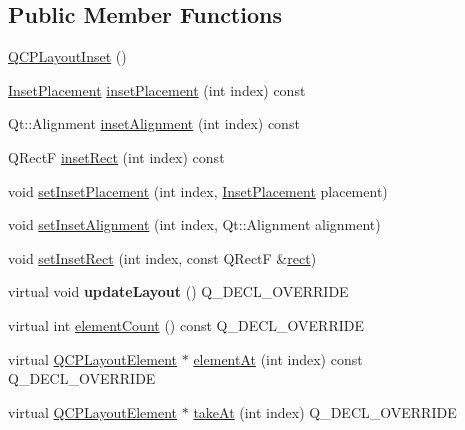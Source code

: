 \subsection*{Public Member Functions}
\begin{DoxyCompactItemize}
\item 
\hyperlink{class_q_c_p_layout_inset_a3ad984f3221735374cc5dee14356a7dd}{Q\+C\+P\+Layout\+Inset} ()
\item 
\hyperlink{class_q_c_p_layout_inset_a8b9e17d9a2768293d2a7d72f5e298192}{Inset\+Placement} \hyperlink{class_q_c_p_layout_inset_a6fcbd74ebbc45bfe64c604b2791aa57f}{inset\+Placement} (int index) const
\item 
Qt\+::\+Alignment \hyperlink{class_q_c_p_layout_inset_a5b33b66f0abbb4a7cc2f8aa6c94cf7f8}{inset\+Alignment} (int index) const
\item 
Q\+RectF \hyperlink{class_q_c_p_layout_inset_ab23099a46af17c31f4c40668f13c9de1}{inset\+Rect} (int index) const
\item 
void \hyperlink{class_q_c_p_layout_inset_a63298830744d5d8c5345511c00fd2144}{set\+Inset\+Placement} (int index, \hyperlink{class_q_c_p_layout_inset_a8b9e17d9a2768293d2a7d72f5e298192}{Inset\+Placement} placement)
\item 
void \hyperlink{class_q_c_p_layout_inset_a62882a4f9ad58bb0f53da12fde022abe}{set\+Inset\+Alignment} (int index, Qt\+::\+Alignment alignment)
\item 
void \hyperlink{class_q_c_p_layout_inset_aa487c8378a6f9533567a2e6430099dc3}{set\+Inset\+Rect} (int index, const Q\+RectF \&\hyperlink{class_q_c_p_layout_element_a208effccfe2cca4a0eaf9393e60f2dd4}{rect})
\item 
\mbox{\label{class_q_c_p_layout_inset_a493526b922ea66a75c45ef1842446988}} 
virtual void {\bfseries update\+Layout} () Q\+\_\+\+D\+E\+C\+L\+\_\+\+O\+V\+E\+R\+R\+I\+DE
\item 
virtual int \hyperlink{class_q_c_p_layout_inset_a7f5aa4d48a2e844cfe6dd7ed8f0861df}{element\+Count} () const Q\+\_\+\+D\+E\+C\+L\+\_\+\+O\+V\+E\+R\+R\+I\+DE
\item 
virtual \hyperlink{class_q_c_p_layout_element}{Q\+C\+P\+Layout\+Element} $\ast$ \hyperlink{class_q_c_p_layout_inset_a881ca205605bae9c034733b808f93a02}{element\+At} (int index) const Q\+\_\+\+D\+E\+C\+L\+\_\+\+O\+V\+E\+R\+R\+I\+DE
\item 
virtual \hyperlink{class_q_c_p_layout_element}{Q\+C\+P\+Layout\+Element} $\ast$ \hyperlink{class_q_c_p_layout_inset_abf2e8233f5b7051220907e62ded490a2}{take\+At} (int index) Q\+\_\+\+D\+E\+C\+L\+\_\+\+O\+V\+E\+R\+R\+I\+DE

\end{DoxyCompactItemize}
